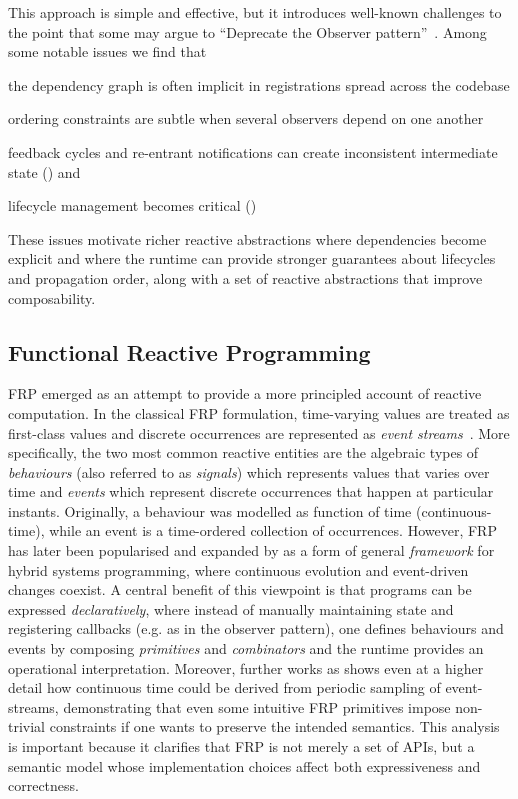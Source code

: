 This approach is simple and effective, but it introduces well-known challenges
to the point that some may argue to ``Deprecate the Observer pattern''~\cite{maier2010DOP}.
Among some notable issues we find that
\begin{enumerate*}[label=(\roman*)]
	\item the dependency graph is often implicit in registrations spread across
	      the codebase
	\item ordering constraints are subtle when several observers depend on one
	      another
	\item feedback cycles and re-entrant notifications can create inconsistent
	      intermediate state () and
	\item lifecycle management becomes critical ()
\end{enumerate*}

These issues motivate richer reactive abstractions where dependencies become
explicit and where the runtime can provide stronger guarantees about lifecycles
and propagation order, along with a set of reactive abstractions that improve
composability.

\subsection{Functional Reactive Programming}\label{ssec:frp}
\ac{FRP} emerged as an attempt to provide a more principled account of reactive
computation. In the classical \ac{FRP} formulation, time-varying values are
treated as first-class values and discrete occurrences are represented as
\emph{event streams}~\cite{elliott1997FRA}. More specifically, the two most
common reactive entities are the algebraic types of \emph{behaviours} (also
referred to as \emph{signals}) which represents values that varies over time
and \emph{events} which represent discrete occurrences that happen at
particular instants. Originally, a behaviour was modelled as function of time
(continuous-time), while an event is a time-ordered collection of occurrences.
However, \ac{FRP} has later been popularised and expanded by
\cite{hudak2000PFRP} as a form of general \emph{framework} for hybrid systems
programming, where continuous evolution and event-driven changes coexist. A
central benefit of this viewpoint is that programs can be expressed
\emph{declaratively}, where instead of manually maintaining state and
registering callbacks (e.g. as in the observer pattern), one defines behaviours
and events by composing \emph{primitives} and \emph{combinators} and the
runtime provides an operational interpretation. Moreover, further works as
\cite{zhanyong2000FRP} shows even at a higher detail how continuous time could
be derived from periodic sampling of event-streams, demonstrating that even
some intuitive \ac{FRP} primitives impose non-trivial constraints if one wants
to preserve the intended semantics. This analysis is important because it
clarifies that \ac{FRP} is not merely a set of \ac{API}s, but a semantic model whose
implementation choices affect both expressiveness and correctness.

